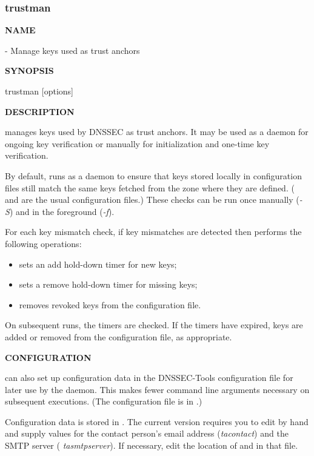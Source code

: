 \clearpage

\subsubsection{trustman}

{\bf NAME}

 - Manage keys used as trust anchors

{\bf SYNOPSIS}

trustman [options]

{\bf DESCRIPTION}

 manages keys used by DNSSEC as trust anchors.  It may be used
as a daemon for ongoing key verification or manually for initialization and
one-time key verification.

By default,  runs as a daemon to ensure that keys stored locally
in configuration files still match the same keys fetched from the zone where
they are defined.  ( and  are the usual
configuration files.) These checks can be run once manually ({\it -S}) and in
the foreground ({\it -f}).

For each key mismatch check, if key mismatches are detected then 
performs the following operations:

\begin{itemize}
\item sets an add hold-down timer for new keys;
\item sets a remove hold-down timer for missing keys;
\item removes revoked keys from the configuration file.
\end{itemize}

On subsequent runs, the timers are checked.  If the timers have expired, keys
are added or removed from the configuration file, as appropriate.

{\bf CONFIGURATION}

 can also set up configuration data in the DNSSEC-Tools
configuration file for later use by the daemon.  This makes fewer command line
arguments necessary on subsequent executions.  (The configuration file is in
.)

Configuration data is stored in .  The current version
requires you to edit  by hand and supply values for
the contact person's email address ({\it tacontact}) and the SMTP server ({\it
tasmtpserver}).  If necessary, edit the location of  and
 in that file.

